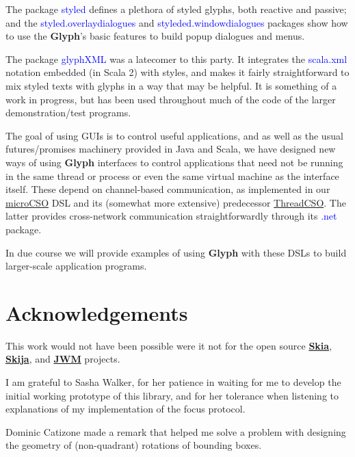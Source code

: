 \documentclass[12pt,a4paper]{article}
\def\Glyph{\textbf{Glyph}\xspace}
\def\Scala#1{\textcolor{blue}{\textsf{#1}}}
\def\S#1{\section{#1}}
\begin{document}
The package \Scala{styled} defines a plethora of styled glyphs,
both reactive and passive; and the \Scala{styled.overlaydialogues}
and \Scala{styleded.windowdialogues} packages show how to use the
\Glyph's basic features to build popup dialogues and menus.

The package \Scala{glyphXML} was a latecomer to this party. It
integrates the \Scala{scala.xml}  notation embedded (in Scala 2)
with styles, and makes it fairly straightforward to mix styled
texts with glyphs in a way that may be helpful. It is
something of a work in progress, but has been used throughout much
of the code of the larger demonstration/test programs.

The goal of using  GUIs is to control useful applications,
and as well as the usual futures/promises machinery provided
in Java and Scala, we have designed new ways of using \Glyph interfaces to
control applications that need not be running in the same thread or process
or even the same virtual machine as the interface itself. These depend
on channel-based communication, as implemented in our
\href{https://github.com/sufrin/microCSO}{microCSO}
DSL and its (somewhat more extensive) predecessor
\href{https://github.com/sufrin/ThreadCSO}{ThreadCSO}. The latter
provides cross-network communication straightforwardly through its
\Scala{.net} package.

In due course we will provide examples of using \Glyph with these DSLs
to build larger-scale application programs.



\S{Acknowledgements}
This work would not have been possible were it not for the
open source \href{https://skia.org/}{\textbf{Skia}},
\href{https://github.com/HumbleUI/HumbleUI}{\textbf{Skija}},
and \href{https://github.com/HumbleUI/JWM}{\textbf{JWM}} projects.

I am grateful to Sasha Walker,
for her patience in waiting for me to develop the initial working prototype of this
library, and for her tolerance when listening to explanations of my implementation
of the focus protocol. 

Dominic Catizone\Footnotemark{$*$} made a remark that helped me solve a
problem with designing the geometry of (non-quadrant) rotations of bounding boxes.
\end{document}
